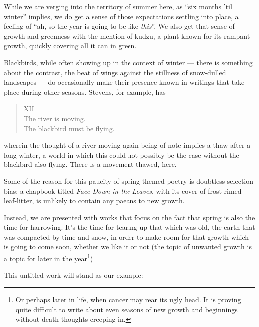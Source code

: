 While we are verging into the territory of summer here, as ``six months 'til winter'' implies, we do get a sense of those expectations settling into place, a feeling of ``ah, so the year is going to be like \emph{this}''. We also get that sense of growth and greenness with the mention of kudzu, a plant known for its rampant growth, quickly covering all it can in green.

Blackbirds, while often showing up in the context of winter --- there is something about the contrast, the beat of wings against the stillness of snow-dulled landscapes --- do occasionally make their presence known in writings that take place during other seasons. Stevens, for example, has

\begin{verse}
XII \\
The river is moving. \\
The blackbird must be flying.

\parencite{blackbird}
\end{verse}
wherein the thought of a river moving again being of note implies a thaw after a long winter, a world in which this could not possibly be the case without the blackbird also flying. There is a movement thawed, here.

Some of the reason for this paucity of spring-themed poetry is doubtless selection bias: a chapbook titled \emph{Face Down in the Leaves}, with its cover of frost-rimed leaf-litter, is unlikely to contain any paeans to new growth.

Instead, we are presented with works that focus on the fact that spring is also the time for harrowing. It's the time for tearing up that which was old, the earth that was compacted by time and snow, in order to make room for that growth which is going to come soon, whether we like it or not (the topic of unwanted growth is a topic for later in the year\footnote{Or perhaps later in life, when cancer may rear its ugly head. It is proving quite difficult to write about even seasons of new growth and beginnings without death-thoughts creeping in.})

This untitled work will stand as our example:


